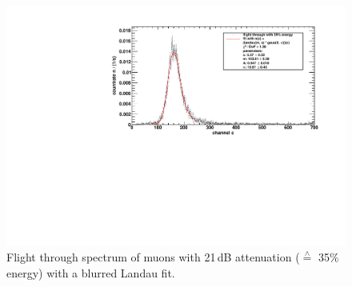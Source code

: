 \begin{figure}[H]
\begin{center}
  \includegraphics[width=\textwidth]{../img/energiekalibration_35.pdf}
  \caption{Flight through spectrum of muons with 21\,dB attenuation ($\overset{\wedge}{=}$ 35\% energy) with a blurred Landau fit.}
  \label{img:ecal:35}
\end{center}
\end{figure}

